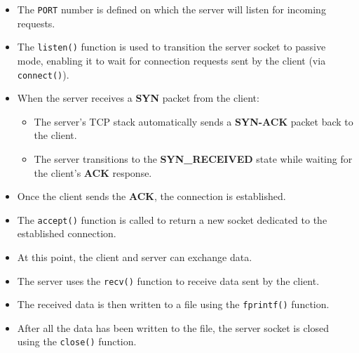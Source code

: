 \documentclass{article}
\begin{document}
\begin{itemize}
    \item The \texttt{PORT} number is defined on which the server will listen for incoming requests.
    \item The \texttt{listen()} function is used to transition the server socket to passive mode, enabling it to wait for connection requests sent by the client (via \texttt{connect()}).
    \item When the server receives a \textbf{SYN} packet from the client:
    \begin{itemize}
        \item The server's TCP stack automatically sends a \textbf{SYN-ACK} packet back to the client.
        \item The server transitions to the \textbf{SYN\_RECEIVED} state while waiting for the client's \textbf{ACK} response.
    \end{itemize}
    \item Once the client sends the \textbf{ACK}, the connection is established.
    \item The \texttt{accept()} function is called to return a new socket dedicated to the established connection.
    \item At this point, the client and server can exchange data.
    \item The server uses the \texttt{recv()} function to receive data sent by the client.
    \item The received data is then written to a file using the \texttt{fprintf()} function.
    \item After all the data has been written to the file, the server socket is closed using the \texttt{close()} function.
\end{itemize}
\end{document}
